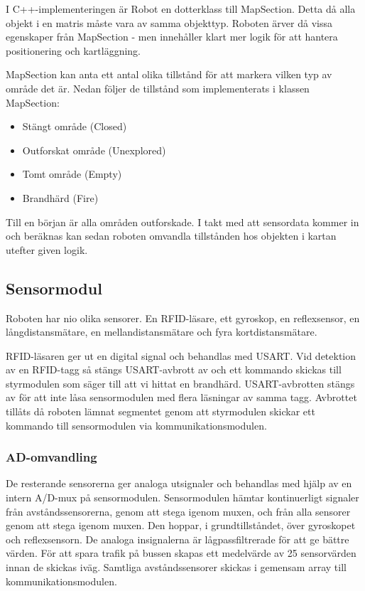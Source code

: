 ﻿\documentclass[a4paper,12pt,fleqn]{article}
\begin{document}
I C++-implementeringen är Robot en dotterklass till MapSection. Detta då alla objekt i en matris måste vara av samma objekttyp. Roboten ärver då vissa egenskaper från MapSection - men innehåller klart mer logik för att hantera positionering och kartläggning. 

MapSection kan anta ett antal olika tillstånd för att markera vilken typ av område det är. Nedan följer de tillstånd som implementerats i klassen MapSection: 

\begin{itemize}
	\item Stängt område (Closed)
	\item Outforskat område (Unexplored)
	\item Tomt område (Empty)
	\item Brandhärd (Fire)
\end{itemize}

Till en början är alla områden outforskade. I takt med att sensordata kommer in och beräknas kan sedan roboten omvandla tillstånden hos objekten i kartan utefter given logik. 

\subsection{Sensormodul}


Roboten har nio olika sensorer. En RFID-läsare, ett gyroskop, en reflexsensor, en långdistansmätare, en mellandistansmätare och fyra kortdistansmätare. 


RFID-läsaren ger ut en digital signal och behandlas med USART. Vid detektion av en RFID-tagg så stängs USART-avbrott av och ett kommando skickas till styrmodulen som säger till att vi hittat en brandhärd. 
USART-avbrotten stängs av för att inte låsa sensormodulen med flera läsningar av samma tagg. Avbrottet tillåts då roboten lämnat segmentet genom att styrmodulen skickar ett kommando till sensormodulen via kommunikationsmodulen.






\subsubsection{AD-omvandling}
De resterande sensorerna ger analoga utsignaler och behandlas med hjälp av en intern A/D-mux på sensormodulen. 
Sensormodulen hämtar kontinuerligt signaler från avståndssensorerna, genom att stega igenom muxen, och från alla sensorer genom att stega igenom muxen. Den hoppar, i grundtillståndet, över gyroskopet och reflexsensorn. De analoga insignalerna är lågpassfiltrerade för att ge bättre värden.
För att spara trafik på bussen skapas ett medelvärde av 25 sensorvärden innan de skickas iväg. Samtliga avståndssensorer skickas i gemensam array till kommunikationsmodulen.
\end{document}

